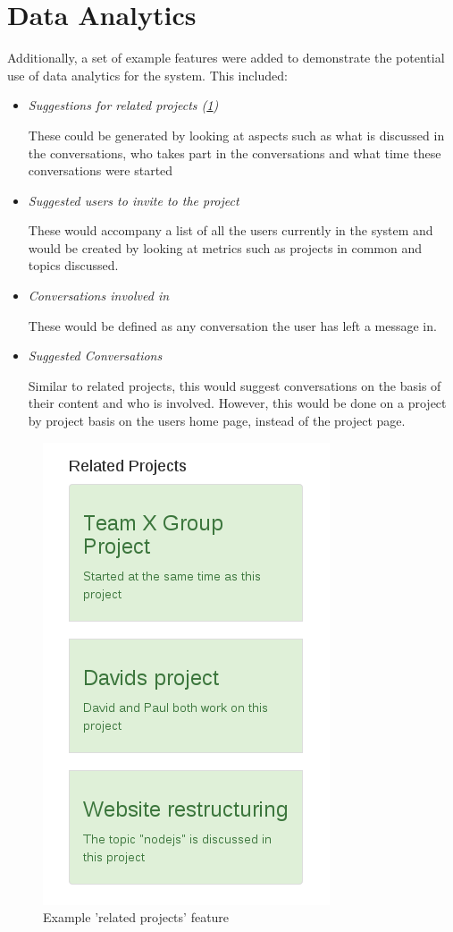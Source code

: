 \documentclass{l4proj}
\begin{document}
\newpage

\section{Data Analytics}
Additionally, a set of example features were added to demonstrate the potential use of data analytics for the system.  This included:

\begin{itemize}
\item \textit{Suggestions for related projects (\ref{fig:5})}
\par These could be generated by looking at aspects such as what is discussed in the conversations, who takes part in the conversations and what time these conversations were started
\item \textit{Suggested users to invite to the project}
\par These would accompany a list of all the users currently in the system and would be created by looking at metrics such as projects in common and topics discussed.
\item \textit{Conversations involved in}
\par These would be defined as any conversation the user has left a message in.
\item \textit{Suggested Conversations}
\par Similar to related projects, this would suggest conversations on the basis of their content and who is involved.  However, this would be done on a project by project basis on the users home page, instead of the project page.
\end{itemize}

\begin{figure}[h]
\includegraphics[scale = 0.8]{RelatedProj.png}
\centering
\caption{Example 'related projects' feature}
\label{fig:5}
\end{figure}
\end{document}
